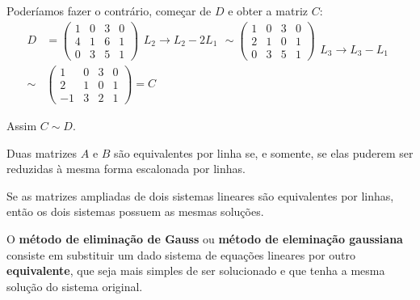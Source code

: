 \begin{exemplos}
\begin{enumerate}[label={\arabic*})]
            Poderíamos fazer o contrário, começar de $D$ e obter a matriz $C$:
            \begin{align*}
                D &= \begin{pmatrix}
                    1 & 0 & 3 & 0\\
                    4 & 1 & 6 & 1\\
                    0 & 3 & 5 & 1
                \end{pmatrix}
                \begin{array}{l}
                    \phantom{x}\\ L_2 \to L_2 - 2L_1\\\phantom{x}
                \end{array} \sim
                \begin{pmatrix}
                    1 & 0 & 3 & 0\\
                    2 & 1 & 0 & 1\\
                    0 & 3 & 5 & 1
                \end{pmatrix}
                \begin{array}{l}
                    \phantom{x}\\ \phantom{x}\\ L_3 \to L_3 - L_1
                \end{array}\\ \sim
                  &\begin{pmatrix}
                    1 & 0 & 3 & 0\\
                    2 & 1 & 0 & 1\\
                    -1 & 3 & 2 & 1
                \end{pmatrix} = C
            \end{align*}

            Assim $C \sim D$.
    \end{enumerate}
\end{exemplos}
\begin{teorema}
    Duas matrizes $A$ e $B$ são equivalentes por linha se, e somente, se elas puderem ser reduzidas \`a mesma forma escalonada por linhas.
\end{teorema}

\begin{teorema}
    Se as matrizes ampliadas de dois sistemas lineares são equivalentes por linhas, então os dois sistemas possuem as mesmas soluç\~oes.
\end{teorema}

O \textbf{método de eliminação de Gauss} ou \textbf{método de eleminação gaussiana} consiste em substituir um dado sistema de equaç\~oes lineares  por outro \textbf{equivalente}, que seja mais simples de ser solucionado e que tenha a mesma solução do sistema original.

